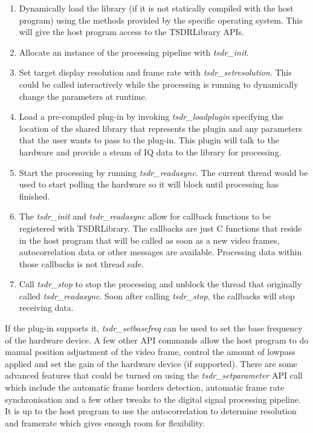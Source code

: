 \documentclass[a4paper,12pt,twoside,openright]{report}
\begin{document}
\begin{enumerate}
	\item Dynamically load the library (if it is not statically compiled with the host program) using the methods provided by the specific operating system. This will give the host program access to the TSDRLibrary APIs.
	\item Allocate an instance of the processing pipeline with \textit{tsdr\_init}.
	\item Set target display resolution and frame rate with \textit{tsdr\_setresolution}. This could be called interactively while the processing is running to dynamically change the parameters at runtime.
	\item Load a pre-compiled plug-in by invoking \textit{tsdr\_loadplugin} specifying the location of the shared library that represents the plugin and any parameters that the user wants to pass to the plug-in. This plugin will talk to the hardware and provide a steam of IQ data to the library for processing.
	\item Start the processing by running \textit{tsdr\_readasync}. The current thread would be used to start polling the hardware so it will block until processing has finished.
	\item The \textit{tsdr\_init} and \textit{tsdr\_readasync} allow for callback functions to be registered with TSDRLibrary. The callbacks are just C functions that reside in the host program that will be called as soon as a new video frames, autocorrelation data or other messages are available. Processing data within those callbacks is not thread safe.
	\item Call \textit{tsdr\_stop} to stop the processing and unblock the thread that originally called \textit{tsdr\_readasync}. Soon after calling \textit{tsdr\_stop}, the callbacks will stop receiving data.
\end{enumerate}

If the plug-in supports it, \textit{tsdr\_setbasefreq} can be used to set the base frequency of the hardware device. A few other API commands allow the host program to do manual position adjustment of the video frame, control the amount of lowpass applied and set the gain of the hardware device (if supported). There are some advanced features that could be turned on using the \textit{tsdr\_setparameter} API call which include the automatic frame borders detection, automatic frame rate synchronisation and a few other tweaks to the digital signal processing pipeline. It is up to the host program to use the autocorrelation to determine resolution and framerate which gives enough room for flexibility.
\end{document}
